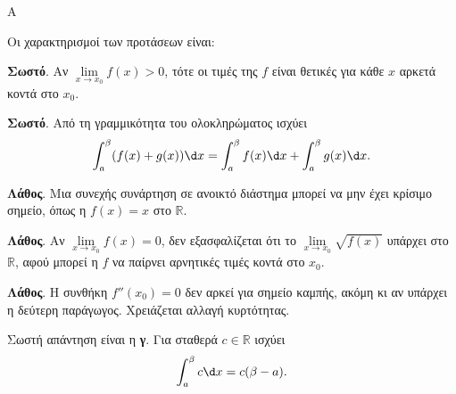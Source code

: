 \begin{thema}{Α}
\begin{erwthma}
\item {}

\item {}

\item {}

\item Οι χαρακτηρισμοί των προτάσεων είναι:
\begin{alist}
\item \textbf{Σωστό}. Αν $\lim\limits_{x\to x_0}f(x)>0$, τότε οι τιμές της $f$ είναι θετικές για κάθε $x$ αρκετά κοντά στο $x_0$.
\item \textbf{Σωστό}. Από τη γραμμικότητα του ολοκληρώματος ισχύει
\[ \dint_a^\beta (f(x)+g(x))\d x=\dint_a^\beta f(x)\d x+\dint_a^\beta g(x)\d x. \]
\item \textbf{Λάθος}. Μια συνεχής συνάρτηση σε ανοικτό διάστημα μπορεί να μην έχει κρίσιμο σημείο, όπως η $f(x)=x$ στο $\mathbb{R}$.
\item \textbf{Λάθος}. Αν $\lim\limits_{x\to x_0}f(x)=0$, δεν εξασφαλίζεται ότι το $\lim\limits_{x\to x_0}\sqrt{f(x)}$ υπάρχει στο $\mathbb{R}$, αφού μπορεί η $f$ να παίρνει αρνητικές τιμές κοντά στο $x_0$.
\item \textbf{Λάθος}. Η συνθήκη $f''(x_0)=0$ δεν αρκεί για σημείο καμπής, ακόμη κι αν υπάρχει η δεύτερη παράγωγος. Χρειάζεται αλλαγή κυρτότητας.
\end{alist}

\item Σωστή απάντηση είναι η \textbf{γ}. Για σταθερά $c\in\mathbb{R}$ ισχύει
\[ \dint_a^\beta c\d x=c(\beta-a). \]
\end{erwthma}
\end{thema}

